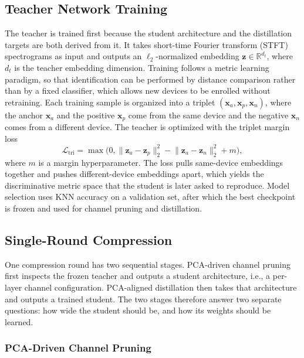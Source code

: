 \documentclass[journal,comsoc]{IEEEtran}
\begin{document}
\subsection{Teacher Network Training}
\label{subsec:teacher}
The teacher is trained first because the student architecture and the distillation targets are both derived from it.
It takes short-time Fourier transform (STFT) spectrograms as input and outputs an $\ell_2$-normalized embedding $\mathbf{z} \in \mathbb{R}^{d_t}$, where $d_t$ is the teacher embedding dimension.
Training follows a metric learning paradigm, so that identification can be performed by distance comparison rather than by a fixed classifier, which allows new devices to be enrolled without retraining.
Each training sample is organized into a triplet $(\mathbf{x}_a, \mathbf{x}_p, \mathbf{x}_n)$, where the anchor $\mathbf{x}_a$ and the positive $\mathbf{x}_p$ come from the same device and the negative $\mathbf{x}_n$ comes from a different device.
The teacher is optimized with the triplet margin loss
\begin{equation}
\label{eq:triplet}
\mathcal{L}_{\text{tri}} =
\max\bigl(0,
\lVert \mathbf{z}_{a} - \mathbf{z}_{p} \rVert_2^2 -
\lVert \mathbf{z}_{a} - \mathbf{z}_{n} \rVert_2^2 + m
\bigr),
\end{equation}
where $m$ is a margin hyperparameter.
The loss pulls same-device embeddings together and pushes different-device embeddings apart, which yields the discriminative metric space that the student is later asked to reproduce.
Model selection uses KNN accuracy on a validation set, after which the best checkpoint is frozen and used for channel pruning and distillation.

\subsection{Single-Round Compression}
\label{subsec:single_round}

One compression round has two sequential stages.
PCA-driven channel pruning first inspects the frozen teacher and outputs a student architecture, i.e., a per-layer channel configuration.
PCA-aligned distillation then takes that architecture and outputs a trained student.
The two stages therefore answer two separate questions: how wide the student should be, and how its weights should be learned.

\subsubsection{PCA-Driven Channel Pruning}
\end{document}
